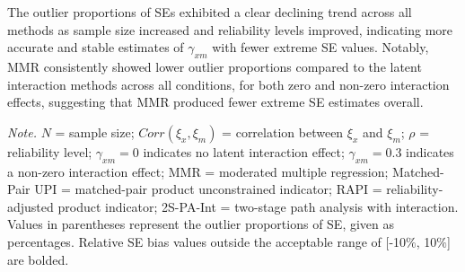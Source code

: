 \documentclass[
  man,mask]{apa6}
\newenvironment{lltable}{\begin{landscape}\centering\begin{ThreePartTable}}{\end{ThreePartTable}\end{landscape}}
\begin{document}
The outlier proportions of SEs exhibited a clear declining trend across all methods as sample size increased and reliability levels improved, indicating more accurate and stable estimates of \(\gamma_{xm}\) with fewer extreme SE values. Notably, MMR consistently showed lower outlier proportions compared to the latent interaction methods across all conditions, for both zero and non-zero interaction effects, suggesting that MMR produced fewer extreme SE estimates overall.

\begin{lltable}

\begin{TableNotes}[para]
\normalsize{\textit{Note.} $\textit{N}$ = sample size; $Corr(\xi_{x}, \xi_{m})$ = correlation between $\xi_{x}$ and $\xi_{m}$; $\rho$ = reliability level; $\gamma_{xm} = 0$ indicates no latent interaction effect; $\gamma_{xm} = 0.3$ indicates a non-zero interaction effect; MMR = moderated multiple regression; Matched-Pair UPI = matched-pair product unconstrained indicator; RAPI = reliability-adjusted product indicator; 2S-PA-Int = two-stage path analysis with interaction. Values in parentheses represent the outlier proportions of SE, given as percentages. Relative SE bias values outside the acceptable range of [-10$\%$, 10$\%$] are bolded.}
\end{TableNotes}

\tiny{

}
\end{lltable}
\end{document}
